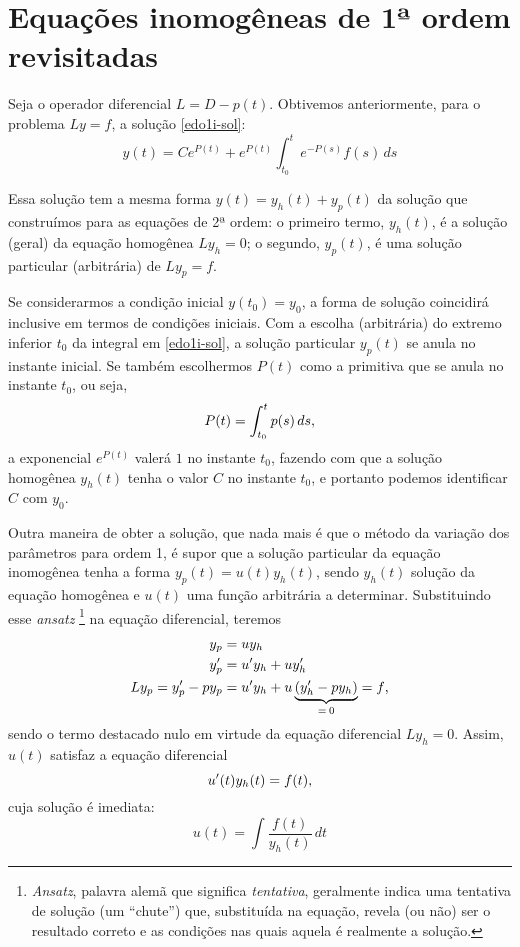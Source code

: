 \documentclass[12pt,a4paper,oneside]{memoir}
\begin{document}

\section{Equações inomogêneas de 1ª ordem revisitadas}

Seja o operador diferencial $L = D - p(t)$.  Obtivemos anteriormente, para o problema $Ly = f$, a solução \eqref{edo1i-sol}:
\[
  y(t) = C e^{P(t)} + e^{P(t)} \int_{t_0}^{t} e^{-P(s)} f(s)\,ds
\]

Essa solução tem a mesma forma $y(t) = y_h(t) + y_p(t)$ da solução que construímos para as equações de 2ª ordem: o primeiro termo, $y_h(t)$, é a solução (geral) da equação homogênea $Ly_h = 0$; o segundo, $y_p(t)$, é uma solução particular (arbitrária) de $Ly_p = f$.

Se considerarmos a condição inicial $y(t_0) = y_0$, a forma de solução coincidirá inclusive em termos de condições iniciais.  Com a escolha (arbitrária) do extremo inferior $t_0$ da integral em \eqref{edo1i-sol}, a solução particular $y_p(t)$ se anula no instante inicial.  Se também escolhermos $P(t)$ como a primitiva que se anula no instante $t_0$, ou seja, \[
  P(t) = \int_{t_0}^{t} p(s)\,ds \text,
\]
a exponencial $e^{P(t)}$ valerá $1$ no instante $t_0$, fazendo com que a solução homogênea $y_h(t)$ tenha o valor $C$ no instante $t_0$, e portanto podemos identificar $C$ com $y_0$.

Outra maneira de obter a solução, que nada mais é que o método da variação dos parâmetros para ordem 1, é supor que a solução particular da equação inomogênea tenha a forma $y_p(t) = u(t) y_h(t)$, sendo $y_h(t)$ solução da equação homogênea e $u(t)$ uma função arbitrária a determinar.  Substituindo esse \textit{ansatz}%
  \footnote{\textit{Ansatz}, palavra alemã que significa \emph{tentativa}, geralmente indica uma tentativa de solução (um ``chute'') que, substituída na equação, revela (ou não) ser o resultado correto e as condições nas quais aquela é realmente a solução.}
na equação diferencial, teremos
\begin{align*}
  y_p  &= u y_h \\
  y_p' &= u' y_h + u y_h' \\
  L y_p = y_p' - p y_p &= u' y_h + u \underbrace{(y_h' - p y_h)}_{=\:0} = f \text,
\end{align*}
sendo o termo destacado nulo em virtude da equação diferencial $Ly_h = 0$.  Assim, $u(t)$ satisfaz a equação diferencial
\begin{equation}
  u'(t) y_h(t) = f(t) \text,
\end{equation}
cuja solução é imediata:
\begin{equation}
  u(t) = \int \frac{f(t)}{y_h(t)} \,dt
\end{equation}
\end{document}

